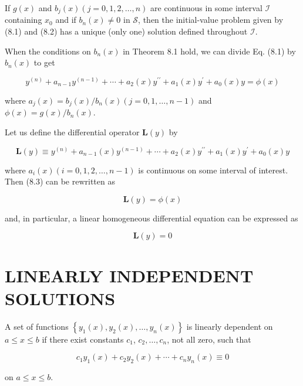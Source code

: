 \documentclass[10pt]{article}
\begin{document}
If $g(x)$ and $b_{j}(x)(j=0,1,2, \ldots, n)$ are continuous in some interval $\mathscr{I}$ containing $x_{0}$ and if $b_{n}(x) \neq 0$ in $\mathscr{S}$, then the initial-value problem given by (8.1) and (8.2) has a unique (only one) solution defined throughout $\mathscr{I}$.

When the conditions on $b_{n}(x)$ in Theorem 8.1 hold, we can divide Eq. (8.1) by $b_{n}(x)$ to get


\begin{equation*}
y^{(n)}+a_{n-1} y^{(n-1)}+\cdots+a_{2}(x) y^{\prime \prime}+a_{1}(x) y^{\prime}+a_{0}(x) y=\phi(x) \tag{8.3}
\end{equation*}


where $a_{j}(x)=b_{j}(x) / b_{n}(x)(j=0,1, \ldots, n-1)$ and $\phi(x)=g(x) / b_{n}(x)$.

Let us define the differential operator $\mathbf{L}(y)$ by


\begin{equation*}
\mathbf{L}(y) \equiv y^{(n)}+a_{n-1}(x) y^{(n-1)}+\cdots+a_{2}(x) y^{\prime \prime}+a_{1}(x) y^{\prime}+a_{0}(x) y \tag{8.4}
\end{equation*}


where $a_{i}(x)(i=0,1,2, \ldots, n-1)$ is continuous on some interval of interest. Then (8.3) can be rewritten as


\begin{equation*}
\mathbf{L}(y)=\phi(x) \tag{8.5}
\end{equation*}


and, in particular, a linear homogeneous differential equation can be expressed as


\begin{equation*}
\mathbf{L}(y)=0 \tag{8.6}
\end{equation*}


\section*{LINEARLY INDEPENDENT SOLUTIONS}
A set of functions $\left\{y_{1}(x), y_{2}(x), \ldots, y_{n}(x)\right\}$ is linearly dependent on $a \leq x \leq b$ if there exist constants $c_{1}$, $c_{2}, \ldots, c_{n}$, not all zero, such that


\begin{equation*}
c_{1} y_{1}(x)+c_{2} y_{2}(x)+\cdots+c_{n} y_{n}(x) \equiv 0 \tag{8.7}
\end{equation*}


on $a \leq x \leq b$.
\end{document}
